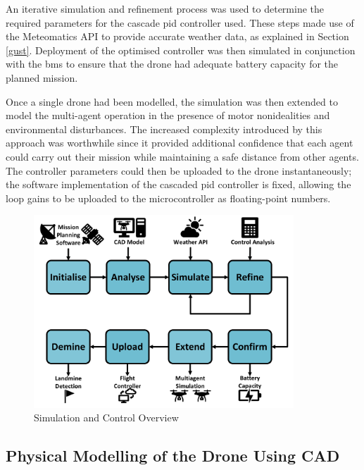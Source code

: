 An iterative simulation and refinement process was used to determine the required parameters for the cascade \gls{pid} controller used. These steps made use of the Meteomatics API to provide accurate weather data, as explained in Section \ref{gust}. Deployment of the optimised controller was then simulated in conjunction with the \gls{bms} to ensure that the drone had adequate battery capacity for the planned mission. 

Once a single drone had been modelled, the simulation was then extended to model the multi-agent operation in the presence of motor nonidealities and environmental disturbances. The increased complexity introduced by this approach was worthwhile since it provided additional confidence that each agent could carry out their mission while maintaining a safe distance from other agents. The controller parameters could then be uploaded to the drone instantaneously; the software implementation of the cascaded \acrshort{pid} controller is fixed, allowing the loop gains to be uploaded to the microcontroller as floating-point numbers.



\begin{figure}[H]
\centering
\includegraphics[width=0.87\textwidth]{figs/Samuel/Figures/Sim and Control Overview BASIC1 (1) (1).pdf}
\caption{Simulation and Control Overview}
\label{fig:simctrloverview}
\end{figure}





\subsection{Physical Modelling of the Drone Using CAD}
\label{cad}

